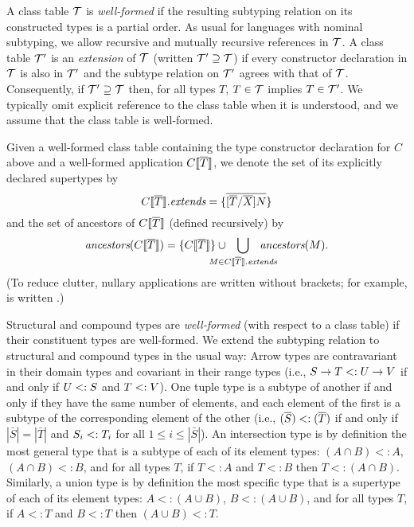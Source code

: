 A class table $\mathcal{T}$ is \emph{well-formed} if the resulting subtyping relation 
on its constructed types is a partial order.
As usual for languages with nominal subtyping, 
we allow recursive and mutually recursive references in $\mathcal{T}$.
A class table $\mathcal{T}'$ is an \emph{extension} of $\mathcal{T}$ (written $\mathcal{T}' \supseteq \mathcal{T}$)
if every constructor declaration in $\mathcal{T}$ is also in $\mathcal{T}'$ 
and the subtype relation on $\mathcal{T}'$ agrees with that of $\mathcal{T}$. 
Consequently, if $\mathcal{T}' \supseteq \mathcal{T}$ then, for all types $T$, $T \in \mathcal{T}$ implies $T \in \mathcal{T}'$.
We typically omit explicit reference to the class table when it is understood, 
and we assume that the class table is well-formed.

Given a well-formed class table 
containing the type constructor declaration for $C$ above 
and a well-formed application $C\llbracket \overline{T} \rrbracket$,
we denote the set of its explicitly declared supertypes by
\[
{C\llbracket \overline{T} \rrbracket}.\textit{extends} = \{ \overline{[\overline{T}/\overline{X}]N} \}
\]
and the set of ancestors of $C\llbracket \overline{T} \rrbracket$ 
(defined recursively) by
\[
\ancestors(C\obb{T}) 
   = \{C\obb{T}\} \cup 
     \hspace*{-4ex} \bigcup_{M \in \myextends{C\obb{T}}} \hspace{-4ex} \ancestors(M).
\]
(To reduce clutter, 
nullary applications are written without brackets; 
for example,  is written .) 

Structural and compound types are \emph{well-formed} 
(with respect to a class table) 
if their constituent types are well-formed. 
We extend the subtyping relation to
structural and compound types in the usual way:
Arrow types are contravariant in their domain types 
and covariant in their range types 
(i.e., $\mbox{\ensuremath{{S} \rightarrow {T}}} <: \mbox{\ensuremath{{U} \rightarrow {V}}}$
if and only if $U <: S$ and $T <: V$).
One tuple type is a subtype of another 
if and only if they have the same number of elements, 
and each element of the first is a subtype of the corresponding element of the other 
(i.e., $( \overline{S} ) <: ( \overline{T} )$
if and only if $|\bar{S}| = |\bar{T}|$
and $S_i <: T_i$ for all $1 \leq i \leq |\bar{S}|$).
An intersection type is by definition the most general type that is a subtype
of each of its element types: $(A \cap B) <: A$, $(A \cap B) <: B$, and for all types $T$,
if $T <: A$ and $T <: B$ then $T <: (A \cap B)$.
Similarly, a union type is by definition the most specific type that is a supertype
of each of its element types: $A <: (A \cup B)$, $B <: (A \cup B)$, and for all types $T$,
if $A <: T$ and $B <: T$ then $(A \cup B) <: T$.

